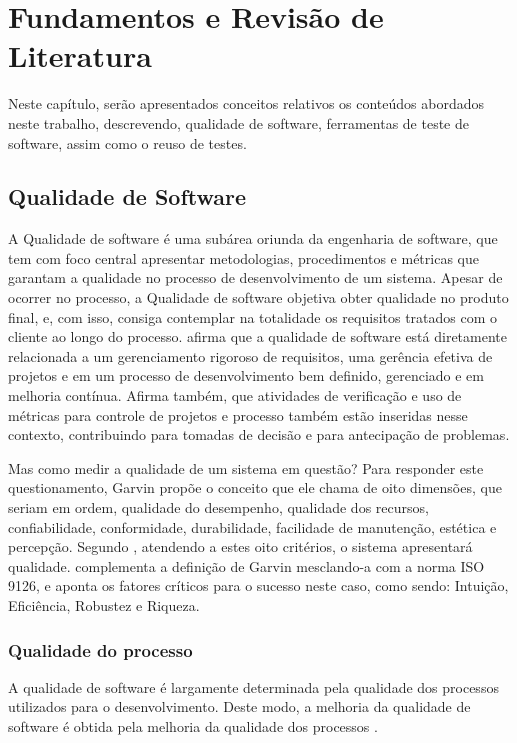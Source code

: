 \documentclass[tg]{mdtufsm}
\begin{document}
\chapter{Fundamentos e Revisão de Literatura}

Neste capítulo, serão apresentados conceitos relativos os conteúdos abordados neste trabalho, descrevendo, qualidade de software, ferramentas de teste de software, assim como o reuso de testes.

\section{Qualidade de Software}

A Qualidade de software é uma subárea oriunda da engenharia de software, que tem com foco central apresentar metodologias,
procedimentos e métricas que garantam a qualidade no processo de desenvolvimento de um sistema. Apesar de ocorrer no processo, a Qualidade de software
objetiva obter qualidade no produto final, e, com isso, consiga contemplar na totalidade os requisitos tratados com o cliente ao longo do processo.
\citeauthor{de2006introduccao} \cite{de2006introduccao} afirma que a qualidade de software está diretamente relacionada a um gerenciamento
rigoroso de requisitos, uma gerência efetiva de projetos e em um processo de desenvolvimento bem definido, gerenciado e em melhoria contínua. Afirma também,
que atividades de verificação e uso de métricas para controle de projetos e processo também estão inseridas nesse contexto, contribuindo para tomadas de
decisão e para antecipação de problemas.

Mas como medir a qualidade de um sistema em questão? Para responder este questionamento, Garvin \cite{garvin1987competing} propõe o conceito que ele chama de
oito dimensões, que seriam em ordem, qualidade do desempenho, qualidade dos recursos, confiabilidade, conformidade, durabilidade, facilidade de manutenção,
estética e percepção. Segundo \citeauthor{garvin1987competing}, atendendo a estes oito critérios, o sistema apresentará qualidade.
\citeauthor{pressman2011engenharia} \cite{pressman2011engenharia} complementa a definição de Garvin mesclando-a com a norma ISO 9126, e aponta os fatores
críticos para o sucesso neste caso, como sendo: Intuição, Eficiência, Robustez e Riqueza.

\subsection{Qualidade do processo}
A qualidade de software é largamente determinada pela qualidade dos processos utilizados para o desenvolvimento. Deste modo, a melhoria
da qualidade de software é obtida pela melhoria da qualidade dos processos \cite{koscianski2007qualidade}.
\end{document}

